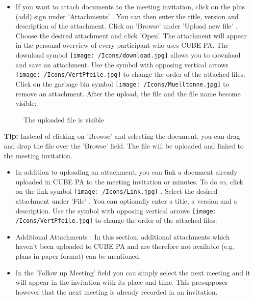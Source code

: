 \vspace{\baselineskip}

\begin{itemize}
\item 
If you want to attach documents to the meeting invitation, click on the plus (add) sign under 'Attachments' . You can then enter the title, version and description of the attachment. Click on 'Browse' under 'Upload new file' . Choose the desired attachment and click 'Open'. The attachment will appear in the personal overview of every participant who uses CUBE PA. The download symbol \texttt{[image: /Icons/download.jpg]}  allows you to download and save an attachment. Use the symbol with opposing vertical arrows \texttt{[image: /Icons/VertPfeile.jpg]} to change the order of the attached files. Click on the garbage bin symbol \texttt{[image: /Icons/Muelltonne.jpg]}  to remove an attachment. After the upload, the file and the file name become visible:
\end{itemize}

\begin{figure}[H]
\caption{The uploaded file is visible}
\end{figure}

\textbf{Tip:} Instead of clicking on 'Browse' and selecting the document, you can drag and drop the file over the 'Browse' field. The file will be uploaded and linked to the meeting invitation.

\vspace{\baselineskip}

\begin{itemize}
\item
In addition to uploading an attachment, you can link a document already uploaded in CUBE PA to the meeting invitation or minutes. To do so, click on the link symbol \texttt{[image: /Icons/Link.jpg]} . Select the desired attachment under 'File' . You can optionally enter a title, a version and a description. Use the symbol with opposing vertical arrows \texttt{[image: /Icons/VertPfeile.jpg]} to change the order of the attached files.
\end{itemize}

\begin{itemize}
\item
Additional Attachments : In this section, additional attachments which haven't been uploaded to CUBE PA and are therefore not available (e.g. plans in paper format) can be mentioned.
\item 
In the 'Follow up Meeting' field you can simply select the next meeting and it will appear in the invitation with its place and time. This presupposes however that the next meeting is already recorded in an invitation.
\end{itemize}

